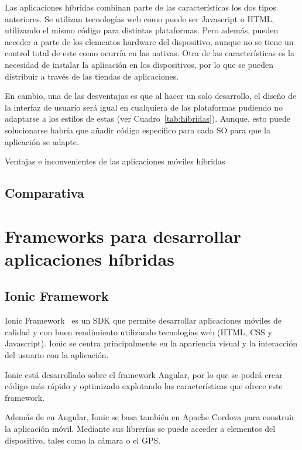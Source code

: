 Las aplicaciones híbridas combinan parte de las características los dos tipos anteriores. Se utilizan tecnologías web 
como puede ser Javascript o HTML, utilizando el mismo código para distintas plataformas. Pero además, pueden 
acceder a parte de los elementos hardware del dispositivo, aunque no se tiene un control total de este como 
ocurría en las nativas. Otra de las características es la necesidad de instalar la aplicación en los dispositivos, por 
lo que se pueden distribuir a través de las tiendas de aplicaciones.

En cambio, una de las desventajas es que al hacer un solo desarrollo, el diseño de la interfaz de usuario será igual
en cualquiera de las plataformas pudiendo no adaptarse a los estilos de estas (ver Cuadro~\ref{tab:hibridas}). Aunque, esto puede solucionarse
habría que añadir código específico para cada \acs{SO} para que la aplicación se adapte.

\begin{table}[hibridas]
	\centering
	{\small
		
	}
	\caption[Ventajas e inconvenientes de las aplicaciones móviles híbridas]
	{Ventajas e inconvenientes de las aplicaciones móviles híbridas~\cite{TIPAPP}}
	\label{tab:hibridas}
\end{table}

\subsection{Comparativa}

\section{Frameworks para desarrollar aplicaciones híbridas}

\subsection{Ionic Framework}

Ionic Framework~\cite{IONIC} es un SDK que permite desarrollar aplicaciones móviles de calidad y con buen 
rendimiento utilizando tecnologías web (HTML, CSS y Javascript). Ionic se centra principalmente en la apariencia 
visual y la interacción del usuario con la aplicación. 

Ionic está desarrollado sobre el framework Angular, por lo que se podrá crear código más rápido y optimizado 
explotando las características que ofrece este framework.

Además de en Angular, Ionic se basa también en Apache Cordova para construir la aplicación móvil. Mediante sus 
librerías se puede acceder a elementos del dispositivo, tales como la cámara o el \acs{GPS}.

